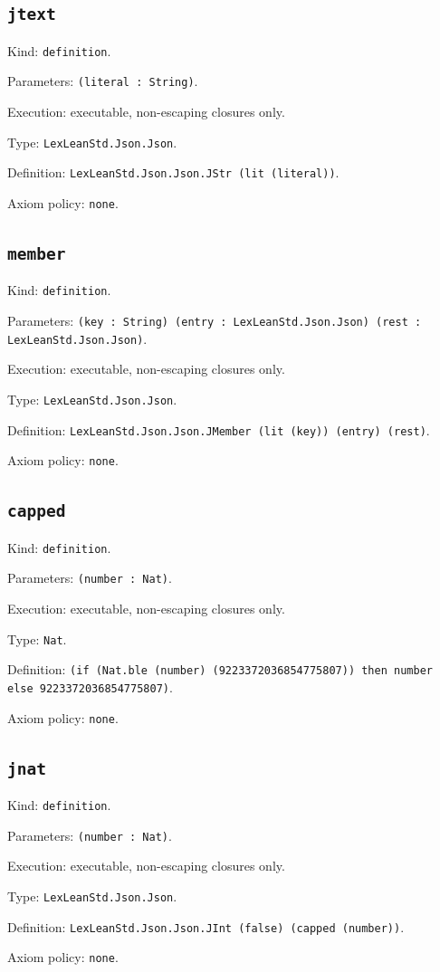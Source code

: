 \documentclass[11pt]{article}
\begin{document}
\subsection*{\texttt{jtext}}
\noindent Kind: \texttt{definition}.\par
\noindent Parameters: \texttt{(literal : String)}.\par
\noindent Execution: executable, non-escaping closures only.\par
\noindent Type: \texttt{LexLeanStd.Json.Json}.\par
\noindent Definition: \texttt{LexLeanStd.Json.Json.JStr (lit (literal))}.\par
\noindent Axiom policy: \texttt{none}.\par
\subsection*{\texttt{member}}
\noindent Kind: \texttt{definition}.\par
\noindent Parameters: \texttt{(key : String) (entry : LexLeanStd.Json.Json) (rest : LexLeanStd.Json.Json)}.\par
\noindent Execution: executable, non-escaping closures only.\par
\noindent Type: \texttt{LexLeanStd.Json.Json}.\par
\noindent Definition: \texttt{LexLeanStd.Json.Json.JMember (lit (key)) (entry) (rest)}.\par
\noindent Axiom policy: \texttt{none}.\par
\subsection*{\texttt{capped}}
\noindent Kind: \texttt{definition}.\par
\noindent Parameters: \texttt{(number : Nat)}.\par
\noindent Execution: executable, non-escaping closures only.\par
\noindent Type: \texttt{Nat}.\par
\noindent Definition: \texttt{(if (Nat.ble (number) (9223372036854775807)) then number else 9223372036854775807)}.\par
\noindent Axiom policy: \texttt{none}.\par
\subsection*{\texttt{jnat}}
\noindent Kind: \texttt{definition}.\par
\noindent Parameters: \texttt{(number : Nat)}.\par
\noindent Execution: executable, non-escaping closures only.\par
\noindent Type: \texttt{LexLeanStd.Json.Json}.\par
\noindent Definition: \texttt{LexLeanStd.Json.Json.JInt (false) (capped (number))}.\par
\noindent Axiom policy: \texttt{none}.\par
\end{document}
